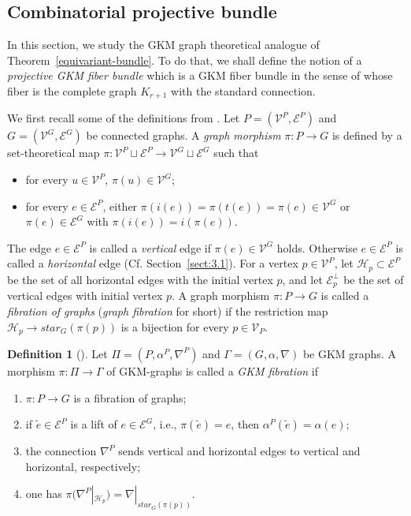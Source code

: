 \documentclass[12pt]{amsart}
\theoremstyle{definition}
\newtheorem{definition}[theorem]{Definition}
\theoremstyle{remark}
\numberwithin{equation}{section}
\begin{document}
\subsection{Combinatorial projective bundle}
\label{sect:6.2}
In this section, we study the GKM graph theoretical analogue of Theorem~\ref{equivariant-bundle}.
To do that, we shall define
the notion of a {\it projective GKM fiber bundle} which is a GKM fiber bundle in the sense of \cite{GSZ} whose fiber is the complete graph $K_{r+1}$ with the standard connection.

We first recall some of the definitions from \cite{GSZ}.
Let $P=(\mathcal{V}^{P},\mathcal{E}^{P})$ and $G=(\mathcal{V}^{G},\mathcal{E}^{G})$ be connected graphs.
A {\it graph morphism} $\pi\colon P\to G$ is defined by a set-theoretical map $\pi:\mathcal{V}^{P}\sqcup \mathcal{E}^{P}\to \mathcal{V}^{G}\sqcup \mathcal{E}^{G}$ such that
\begin{itemize}
\item for every $u\in \mathcal{V}^{P}$, $\pi(u)\in \mathcal{V}^{G}$;
\item for every $e\in \mathcal{E}^{P}$, either $\pi(i(e))=\pi(t(e))=\pi(e)\in \mathcal{V}^{G}$ or $\pi(e)\in \mathcal{E}^{G}$ with $\pi(i(e))=i(\pi(e))$.
\end{itemize}
The edge $e\in \mathcal{E}^{P}$ is called a {\it vertical} edge if $\pi(e)\in \mathcal{V}^{G}$ holds.
Otherwise $e\in \mathcal{E}^{P}$ is called a {\it horizontal} edge (Cf. Section~\ref{sect:3.1}).
For a vertex $p\in \mathcal{V}^{P}$,
let $\mathcal{H}_{p}\subset \mathcal{E}^{P}$ be the set of all horizontal edges with the initial vertex $p$, and
let $\mathcal{E}^{\perp}_{p}$ be the set of vertical edges with initial vertex $p$.
A graph morphism $\pi\colon P\to G$ is called a {\it fibration of graphs} ({\it graph fibration} for short) if the restriction map $\mathcal{H}_{p}\to star_{G}(\pi(p))$ is a bijection for every $p\in \mathcal{V}_{P}$.

\begin{definition}[\cite{GSZ}]
\label{defn:gsz1}
Let $\Pi=(P,\alpha^{P},\nabla^{P})$ and $\Gamma=(G,\alpha,\nabla)$ be GKM graphs.
A morphism $\pi\colon \Pi\to \Gamma$ of GKM-graphs is called a \textit{GKM fibration} if
\begin{enumerate}[label=(\roman*)]
\item $\pi:P\to G$ is a fibration of graphs;
\item if $\widetilde{e}\in \mathcal{E}^{P}$ is a lift of $e\in \mathcal{E}^{G}$, i.e., $\pi(\widetilde{e})=e$, then $\alpha^{P}(\widetilde{e})=\alpha(e)$;
\item the connection $\nabla^{P}$ sends vertical and horizontal edges to vertical and horizontal, respectively;
\item one has $\pi(\nabla^{P}|_{\mathcal{H}_{p}})=\nabla|_{star_{G}(\pi(p))}$.
\end{enumerate}
\end{definition}
\end{document}
